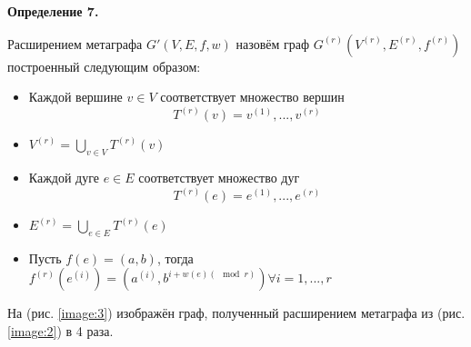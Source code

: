 \documentclass[14pt]{mmcs-article}
\begin{document}
\textbf{Определение 7.}

Расширением метаграфа $G'(V,E,f,w)$ назовём граф $G^{(r)}(V^{(r)}, E^{(r)}, f^{(r)})$ построенный следующим образом:

\begin{itemize}
    \item Каждой вершине $v \in V$ соответствует множество вершин
    \[
        T^{(r)}(v) = {v^{(1)}, ..., v^{(r)}}
    \]

    \item $V^{(r)} = \bigcup_{v \in V}T^{(r)}(v)$
    \item Каждой дуге $e \in E$ соответствует множество дуг 
    \[
        T^{(r)}(e) = {e^{(1)}, ..., e^{(r)}}
    \]

    \item $E^{(r)} = \bigcup_{e \in E}T^{(r)}(e)$

    \item Пусть $f(e) = (a, b)$, тогда $f^{(r)}(e^{(i)}) = (a^{(i)}, b^{i + w(e) (\mod{r})}) \forall i = 1,...,r$
\end{itemize}



На (рис. \ref{image:3}) изображён граф, полученный расширением метаграфа из (рис. \ref{image:2}) в 4 раза.
\end{document}
